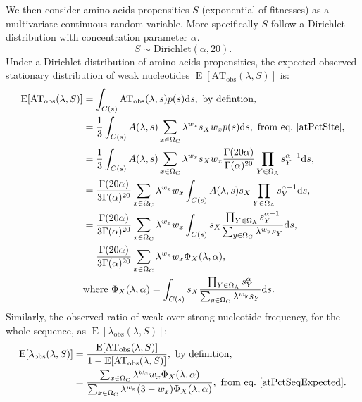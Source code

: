 We then consider amino-acids propensities $S$ (exponential of fitnesses) as a multivariate continuous random variable.
More specifically $S$ follow a Dirichlet distribution with concentration parameter $\alpha$.
\begin{equation}
S \sim \mathrm{Dirichlet}(\alpha, 20).
\end{equation}
Under a Dirichlet distribution of amino-acids propensities, the expected observed stationary distribution of weak nucleotides $\operatorname{E} [\mathrm{AT_{obs}}(\lambda, S)]$ is:
\begin{align}
\operatorname{E} [\mathrm{AT_{obs}}(\lambda, S)]
& =\int_{C(s)} \mathrm{AT_{obs}}(\lambda, s) p(s) \der s, \ \textrm{by defintion}, \\
& =\frac{1}{3} \int_{C(s)} A(\lambda, s) \sum_{x \in \SetCodon} 
\lambda^{w_x} s_X w_x p(s) \der s, \ \textrm{from eq.} \ \ref{atPctSite}, \\
& =\frac{1}{3} \int_{ C(s)} A(\lambda, s) \sum_{x \in \SetCodon}  \lambda^{w_x} s_X w_x {\frac {\Gamma (20 \alpha)}{\Gamma (\alpha )^{20}}} \prod_{Y \in \SetAa} s_Y^{\alpha-1} \der s, \\
& ={\frac {\Gamma (20 \alpha)}{3\Gamma (\alpha )^{20}}} \sum_{x \in \SetCodon} \lambda^{w_x} w_x  \int_{ C(s)} A(\lambda, s) s_X \prod_{Y \in \SetAa} s_Y^{\alpha-1} \der s, \\
& ={\frac {\Gamma (20 \alpha)}{3\Gamma (\alpha )^{20}}} \sum_{x \in \SetCodon} \lambda^{w_x} w_x \int_{ C(s)} s_X \dfrac{\prod_{Y \in \SetAa} s_Y^{\alpha-1}}{\sum_{y \in \SetCodon} \lambda^{w_y} s_Y} \der s, \\
& ={\frac {\Gamma (20 \alpha)}{3\Gamma (\alpha )^{20}}} \sum_{x \in \SetCodon} \lambda^{w_x} w_x \Phi_X(\lambda, \alpha),\\
&  \textrm{where} \  \Phi_X(\lambda, \alpha) = \int_{ C(s)} s_X \dfrac{\prod_{Y \in \SetAa} s_Y^{\alpha}}{\sum_{y \in \SetCodon} \lambda^{w_y} s_Y}\der s.
\label{atPctSeqExpected}
\end{align}
Similarly, the observed ratio of weak over strong nucleotide frequency, for the whole sequence, as $\operatorname{E} [\lambda_{\mathrm{obs}}(\lambda, S)]$: 
\begin{align}
\operatorname{E} [\lambda_{\mathrm{obs}}(\lambda, S)]
& =\frac{\operatorname{E} [\mathrm{AT_{obs}}(\lambda, S)]}{ 1 - \operatorname{E} [\mathrm{AT_{obs}}(\lambda, S)] }, \ \textrm{by definition},\\
& =\frac{\sum_{x \in \Omega_{\mathrm{C}}} \lambda^{w_x} w_x \Phi_X(\lambda, \alpha)}{\sum_{x \in \Omega_{\mathrm{C}}} \lambda^{w_x} (3 - w_x) \Phi_X(\lambda, \alpha)}, \ \textrm{from eq.} \ \ref{atPctSeqExpected}.
\label{atgcPctSeqExpected}
\end{align}
